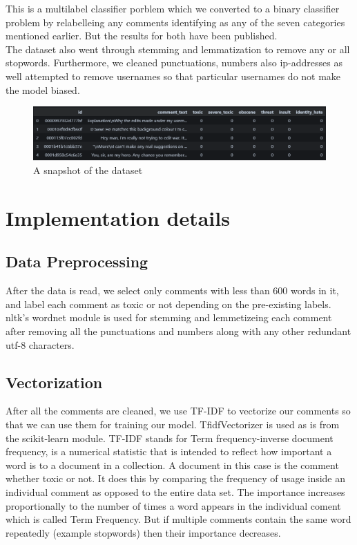 \documentclass[11pt]{article}
\begin{document}
This is a multilabel classifier porblem which we converted to a binary classifier problem by relabelleing any comments identifying as any of the seven categories mentioned earlier. But the results for both have been published. \\
The dataset also went through stemming and lemmatization to remove any or all stopwords. Furthermore, we cleaned punctuations, numbers also ip-addresses as well attempted to remove usernames so that particular usernames do not make the model biased.\\
\begin{figure}[h]
	\begin{center}
		\includegraphics[scale=0.35]{figs/data_set.png}
		\caption{A snapshot of the dataset}
		\label{fig:dataset}
	\end{center}
\end{figure}



\section{Implementation details}
\subsection*{Data Preprocessing}
After the data is read, we select only comments with less than 600 words in it, 
and label each comment as toxic or not depending on the pre-existing labels.
nltk's wordnet module is used for stemming and lemmetizeing each comment 
after removing all the punctuations and numbers along with any other 
redundant utf-8 characters.
\subsection*{Vectorization} 
After all the comments are cleaned, we use TF-IDF to vectorize 
our comments so that we can use them for training our model. 
TfidfVectorizer is used as is from the scikit-learn module. TF-IDF stands for 
Term frequency-inverse document frequency, is a numerical statistic that is
intended to reflect how important a word is to a document in a collection.
A document in this case is the comment whether toxic or not. 
It does this by comparing the frequency of usage inside an individual comment
as opposed to the entire data set. 
The importance increases proportionally to the number of times a word appears in the 
individual coment which is called Term Frequency. 
But if multiple comments contain the same word repeatedly (example stopwords) 
then their importance decreases. 
\end{document}
